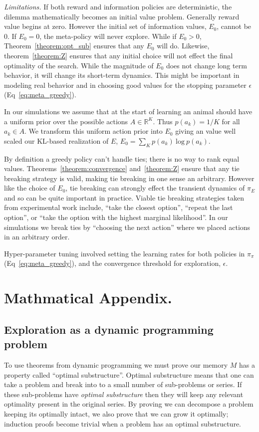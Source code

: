 \documentclass[9pt,twocolumn,twoside]{pnas-new}
\begin{document}
\textit*{Limitations.} If both reward and information policies are deterministic, the dilemma mathematically becomes an initial value problem. Generally reward value begins at zero. However the initial set of information values, $E_0$, cannot be 0. If $E_0 = 0$, the meta-policy will never explore. While if $E_0 > 0$, Theorem~\ref{theorem:opt_sub} ensures that any $E_0$ will do. Likewise, theorem~\ref{theorem:Z} ensures that any initial choice will not effect the final optimality of the search. While the magnitude of $E_0$ does not change long term behavior, it will change its short-term dynamics. This might be important in modeling real behavior and in choosing good values for the stopping parameter $\epsilon$ (Eq~\ref{eq:meta_greedy}). 

In our simulations we assume that at the start of learning an animal should have a uniform prior over the possible actions $A \in \mathbb{R}^K$. Thus $p(a_k) = 1/K$ for all $a_k \in A$. We transform this uniform action prior into $E_0$ giving an value well scaled our KL-based realization of $E$, $E_0 = \sum_K p(a_k)\ \text{log}\ p(a_k)$. 

By definition a greedy policy can't handle ties; there is no way to rank equal values. Theorems~\ref{theorem:convergence} and~\ref{theorem:Z} ensure that any tie breaking strategy is valid, making tie breaking in one sense an arbitrary. However like the choice of $E_0$, tie breaking can strongly effect the transient dynamics of $\pi_E$ and so can be quite important in practice. Viable tie breaking strategies taken from experimental work include, ``take the closest option'', ``repeat the last option'', or ``take the option with the highest marginal likelihood''. In our simulations we break ties by ``choosing the next action'' where we placed actions in an arbitrary order.

Hyper-parameter tuning involved setting the learning rates for both policies in $\pi_{\pi}$ (Eq~\ref{eq:meta_greedy}), and the convergence threshold for exploration, $\epsilon$. 



\clearpage
\newpage
\section*{Mathmatical Appendix.}
\subsection*{Exploration as a dynamic programming problem}
To use theorems from dynamic programming we must prove our memory $M$ has a property called ``optimal substructure''. Optimal substructure means that one can take a problem and break into to a small number of sub-problems or series. If these sub-problems have \textit{optimal substructure} then they will keep any relevant optimality present in the original series. By proving we can decompose a problem keeping its optimally intact, we also prove that we can grow it optimally; induction proofs become trivial when a problem has an optimal substructure.
\end{document}

